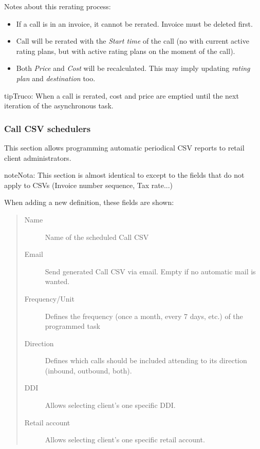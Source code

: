 \documentclass[letterpaper,10pt,spanish]{sphinxmanual}
\begin{document}
Notes about this rerating process:
\begin{itemize}
\item {} 
If a call is in an invoice, it cannot be rerated. Invoice must be deleted first.

\item {} 
Call will be rerated with the \emph{Start time} of the call (no with current active rating plans, but with active rating plans
on the moment of the call).

\item {} 
Both \emph{Price} and \emph{Cost} will be recalculated. This may imply updating \emph{rating plan} and \emph{destination} too.

\end{itemize}

\begin{notice}{tip}{Truco:}
When a call is rerated, cost and price are emptied until the next iteration of the asynchronous task.
\end{notice}


\subsubsection{Call CSV schedulers}
\label{administration_portal/client/retail/calls/call_csv_schedulers:call-csv-schedulers}\label{administration_portal/client/retail/calls/call_csv_schedulers::doc}
This section allows programming automatic periodical CSV reports to retail client administrators.

\begin{notice}{note}{Nota:}
This section is almost identical to {\hyperref[administration_portal/brand/invoicing/invoice_schedulers:invoice\string-schedulers]{}} except to the
fields that do not apply to CSVs (Invoice number sequence, Tax rate...)
\end{notice}

When adding a new definition, these fields are shown:
\begin{quote}
\begin{description}
\item[{Name}] \leavevmode
Name of the scheduled Call CSV

\item[{Email}] \leavevmode
Send generated Call CSV via email. Empty if no automatic mail is wanted.

\item[{Frequency/Unit}] \leavevmode
Defines the frequency (once a month, every 7 days, etc.) of the programmed task

\item[{Direction}] \leavevmode
Defines which calls should be included attending to its direction (inbound, outbound, both).

\item[{DDI}] \leavevmode
Allows selecting client's one specific DDI.

\item[{Retail account}] \leavevmode
Allows selecting client's one specific retail account.

\end{description}
\end{quote}
\end{document}
